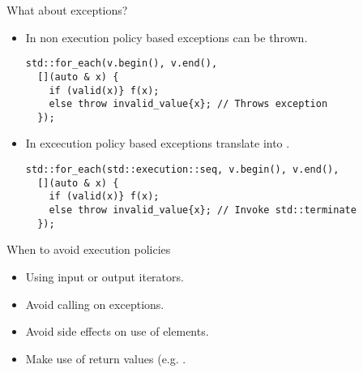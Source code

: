 \begin{frame}[t,fragile]{What about exceptions?}
\begin{itemize}
  \item In non execution policy based exceptions can be thrown.
\begin{lstlisting}
std::for_each(v.begin(), v.end(),
  [](auto & x) {
    if (valid(x)} f(x);
    else throw invalid_value{x}; // Throws exception
  });
\end{lstlisting}

\vfill\pause
  \item In excecution policy based exceptions translate into 
        .

\begin{lstlisting}
std::for_each(std::execution::seq, v.begin(), v.end(),
  [](auto & x) {
    if (valid(x)} f(x);
    else throw invalid_value{x}; // Invoke std::terminate
  });
\end{lstlisting}
\end{itemize}
\end{frame}

\begin{frame}[t]{When to avoid execution policies}
\begin{itemize}
  \item Using input or output iterators.
  \vfill\pause
  \item Avoid calling  on exceptions.
  \vfill\pause
  \item Avoid side effects on use of elements.
  \vfill\pause
  \item Make use of return values (e.g. .
\end{itemize}
\end{frame}
